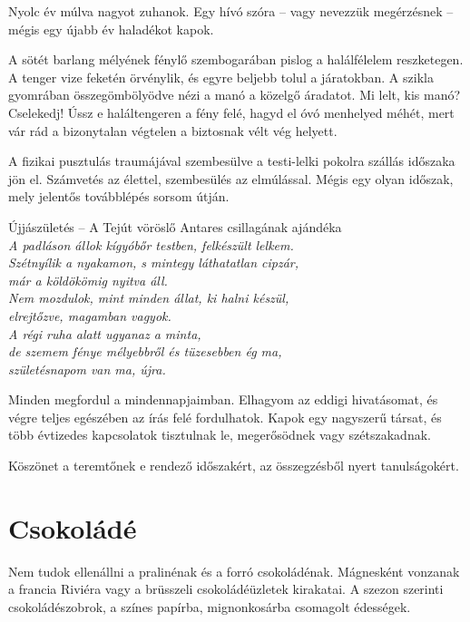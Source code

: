 Nyolc év múlva nagyot zuhanok. Egy hívó szóra -- vagy nevezzük megérzésnek
-- mégis egy újabb év haladékot kapok.

A sötét barlang mélyének fénylő szembogarában pislog a halálfélelem
reszketegen. A tenger vize feketén örvénylik, és egyre beljebb tolul
a járatokban. A szikla gyomrában összegömbölyödve nézi a manó a
közelgő áradatot. Mi lelt, kis manó? Cselekedj! Ússz e haláltengeren
a fény felé, hagyd el óvó menhelyed méhét, mert vár rád a bizonytalan
végtelen a biztosnak vélt vég helyett.

A fizikai pusztulás traumájával szembesülve a testi-lelki pokolra
szállás időszaka jön el. Számvetés az élettel, szembesülés az elmúlással.
Mégis egy olyan időszak, mely jelentős továbblépés sorsom
útján.

\bigskip
\begin{Verse}
Újjászületés -- A Tejút vöröslő Antares csillagának ajándéka	\\
\itshape
A padláson állok kígyóbőr testben, felkészült lelkem.		\\
Szétnyílik a nyakamon, s mintegy láthatatlan cipzár,		\\
már a köldökömig nyitva áll.					\\
Nem mozdulok, mint minden állat, ki halni készül,		\\
elrejtőzve, magamban vagyok.					\\
A régi ruha alatt ugyanaz a minta,				\\
de szemem fénye mélyebbről és tüzesebben ég ma,			\\
születésnapom van ma, újra.
\end{Verse}

\bigskip
Minden megfordul a mindennapjaimban. Elhagyom az eddigi hivatásomat,
és végre teljes egészében az írás felé fordulhatok. Kapok egy
nagyszerű társat, és több évtizedes kapcsolatok tisztulnak le,
megerősödnek vagy szétszakadnak.

Köszönet a teremtőnek e rendező időszakért, az összegzésből nyert
tanulságokért.

\section{Csokoládé}

Nem tudok ellenállni a pralinénak és a forró csokoládénak. Mágnesként
vonzanak a francia Riviéra vagy a brüsszeli csokoládéüzletek
kirakatai. A szezon szerinti csokoládészobrok, a színes papírba,
mignonkosárba csomagolt édességek.

